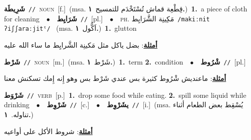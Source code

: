 \documentclass[10pt,a4paper,twoside]{article} %
\begin{document}
\begin{multicols}{2}
{\setlength\topsep{0pt}\textbf{\foreignlanguage{arabic}{شَرِيطَة}}\ {\color{gray}\texttt{//}\color{black}}\ \textsc{noun}\ [f.]\ \color{gray}(msa. \foreignlanguage{arabic}{قِطْعِة قماش تُسْتَخْدَم للتمسيح}~\foreignlanguage{arabic}{\textbf{١.}})\color{black}\ \textbf{1.}~a piece of cloth for cleaning\ \ $\bullet$\ \ \setlength\topsep{0pt}\textbf{\foreignlanguage{arabic}{شَرَايِط}}\ {\color{gray}\texttt{//}\color{black}}\ [pl.]\ \ $\bullet$\ \ \textsc{ph.} \color{gray} \foreignlanguage{arabic}{مَكِينِة الشَّرَايِط}\color{black}\ {\color{gray}\texttt{/{\sffamily makiːnit ʔiʃʃaraːjitˤ}/}\color{black}}\ \color{gray} (msa. \foreignlanguage{arabic}{اَكُّول}~\foreignlanguage{arabic}{\textbf{١.}})\color{black}\ \textbf{1.}~glutton\  \begin{flushright}\color{gray}\foreignlanguage{arabic}{\textbf{\underline{\foreignlanguage{arabic}{أمثلة}}}: بضل ياكل مثل مَكينِة الشَّرايِط ما ساء الله عليه}\end{flushright}\color{black}} \vspace{2mm}

{\setlength\topsep{0pt}\textbf{\foreignlanguage{arabic}{شَرْط}}\ {\color{gray}\texttt{//}\color{black}}\ \textsc{noun}\ [m.]\ \color{gray}(msa. \foreignlanguage{arabic}{شَرْط}~\foreignlanguage{arabic}{\textbf{١.}})\color{black}\ \textbf{1.}~term  \textbf{2.}~condition\ \ $\bullet$\ \ \setlength\topsep{0pt}\textbf{\foreignlanguage{arabic}{شْرُوط}}\ {\color{gray}\texttt{//}\color{black}}\ [pl.]\  \begin{flushright}\color{gray}\foreignlanguage{arabic}{\textbf{\underline{\foreignlanguage{arabic}{أمثلة}}}: ماعنديش شْرُوط كثيرة بس عندي شَرْط بس وهو إِنه إِمك تسكنش معنا}\end{flushright}\color{black}} \vspace{2mm}

{\setlength\topsep{0pt}\textbf{\foreignlanguage{arabic}{شَرْوَط}}\ {\color{gray}\texttt{//}\color{black}}\ \textsc{verb}\ [p.]\ \textbf{1.}~drop some food while eating.  \textbf{2.}~spill some liquid while drinking\ \ $\bullet$\ \ \setlength\topsep{0pt}\textbf{\foreignlanguage{arabic}{شَرْوِط}}\ {\color{gray}\texttt{//}\color{black}}\ [c.]\ \ $\bullet$\ \ \setlength\topsep{0pt}\textbf{\foreignlanguage{arabic}{يشَرْوِط}}\ {\color{gray}\texttt{//}\color{black}}\ [i.]\ \color{gray}(msa. \foreignlanguage{arabic}{يُسْقِط بعض الطعام أثناء تناوله.}~\foreignlanguage{arabic}{\textbf{١.}})\color{black}\  \begin{flushright}\color{gray}\foreignlanguage{arabic}{\textbf{\underline{\foreignlanguage{arabic}{أمثلة}}}: شروط الأكل على أواعيه}\end{flushright}\color{black}} \vspace{2mm}


\end{multicols}
\end{document}
